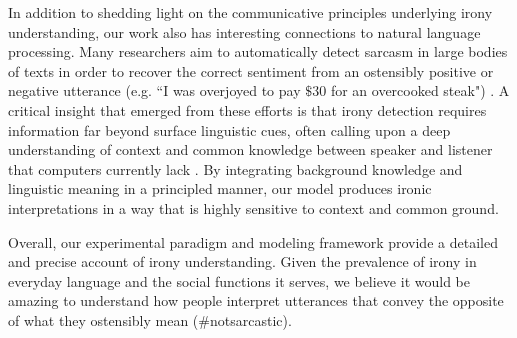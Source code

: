 \documentclass[10pt,letterpaper]{article}
\begin{document}
In addition to shedding light on the communicative principles underlying irony understanding, our work also has interesting connections to natural language processing. Many researchers aim to automatically detect sarcasm in large bodies of texts in order to recover the correct sentiment from an ostensibly positive or negative utterance (e.g. ``I was overjoyed to pay $\$30$ for an overcooked steak") \cite{davidov2010semi, filatova2012irony}. A critical insight that emerged from these efforts is that irony detection requires information far beyond surface linguistic cues, often calling upon a deep understanding of context and common knowledge between speaker and listener that computers currently lack \cite{gonzalez2011identifying, wallacehumans}. By integrating background knowledge and linguistic meaning in a principled manner, our model produces ironic interpretations in a way that is highly sensitive to context and common ground. 

Overall, our experimental paradigm and modeling framework provide a detailed and precise account of irony understanding. Given the prevalence of irony in everyday language and the social functions it serves, we believe it would be amazing to understand how people interpret utterances that convey the opposite of what they ostensibly mean ($\#$notsarcastic). 

%
%



\end{document}
